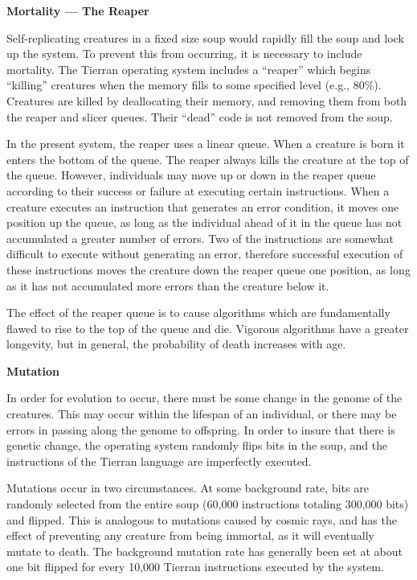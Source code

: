 \LP
\bf Mortality --- The Reaper\rm
\eLP

Self-replicating creatures in a fixed size soup would rapidly fill the
soup and lock up the system.  To prevent this from occurring, it is
necessary to include mortality.  The Tierran operating system includes a
``reaper'' which begins ``killing'' creatures when the memory fills to some
specified level (e.g., 80\%).  Creatures are killed by deallocating their
memory, and removing them from both the reaper and slicer queues.  Their
``dead'' code is not removed from the soup.

In the present system, the reaper uses a linear queue.  When a creature is
born it enters the bottom of the queue.  The reaper always kills the creature
at the top of the queue.  However, individuals may move up or down in the
reaper queue according to their success or failure at executing certain
instructions.  When a creature executes an instruction that generates an
error condition, it moves one position up the queue, as long as the
individual ahead of it in the queue has not accumulated a greater number
of errors.  Two of the instructions are somewhat difficult to execute
without generating an error, therefore successful execution of these
instructions moves the creature down the reaper queue one position, as long
as it has not accumulated more errors than the creature below it.

The effect of the reaper queue is to cause algorithms which are fundamentally
flawed to rise to the top of the queue and die.  Vigorous algorithms have a
greater longevity, but in general, the probability of death increases with age.

\LP
\bf Mutation\rm
\eLP

In order for evolution to occur, there must be some change in the genome
of the creatures.  This may occur within the lifespan of an individual,
or there may be errors in passing along the genome to offspring.  In order
to insure that there is genetic change, the operating system randomly flips
bits in the soup, and the instructions of the Tierran language are
imperfectly executed.

Mutations occur in two circumstances.  At some background rate, bits are
randomly selected from the entire soup (60,000 instructions totaling
300,000 bits) and flipped.  This is analogous to mutations caused by
cosmic rays, and has the effect of preventing any creature from being
immortal, as it will eventually mutate to death.  The background mutation
rate has generally been set at about one bit flipped for every 10,000
Tierran instructions executed by the system.

